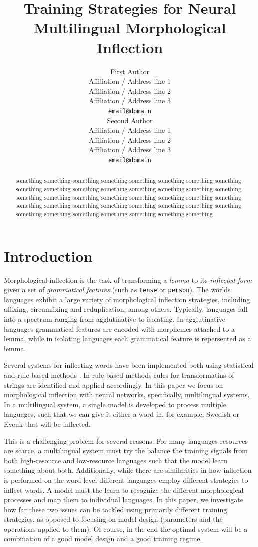 \documentclass[11pt,a4paper]{article}
\title{Training Strategies for Neural Multilingual Morphological Inflection}
\author{First Author \\
  Affiliation / Address line 1 \\
  Affiliation / Address line 2 \\
  Affiliation / Address line 3 \\
  \texttt{email@domain} \\\And
  Second Author \\
  Affiliation / Address line 1 \\
  Affiliation / Address line 2 \\
  Affiliation / Address line 3 \\
  \texttt{email@domain} \\}
\date{}
\newcommand\jp[1]{\textbf{JP: #1}}
\begin{document}
\maketitle
\begin{abstract}
something something something something something something
something something something something something something
something something something something something something
something something something something something something
something something something something something something
something something something something something something
something something something 
\end{abstract}

\section{Introduction}


Morphological inflection is the task of transforming a \emph{lemma} to
its \emph{inflected form} given a set of \emph{grammatical features}
(such as \texttt{tense} or \texttt{person}).  The worlds languages
exhibit a large variety of morphological inflection strategies,
including affixing, circumfixing and reduplication, among
others.
Typically, languages
fall into a spectrum ranging from agglutinative to isolating. In
agglutinative languages grammatical features are encoded with
morphemes attached to a lemma, while in isolating languages each
grammatical feature is repersented as a lemma.

Several systems for inflecting words have been implemented both using
statistical \cite{DBLP:conf/eacl/SmitVGK14, kann2016med} and rule-based
methods \cite{DBLP:phd/basesearch/Hulden09}. In rule-based methods rules for
transformatins of strings are identified and applied accordingly. In
this paper we focus on morphological inflection with neural networks,
specifically, multilingual systems. In a multilingual system, a single
model is developed to process multiple languages, such that we can
give it either a word in, for example, Swedish or Evenk that will be
inflected.

This is a challenging problem for several reasons. For many languages
resources are scarce, a multilingual system must try the balance the
training signals from both high-resource and low-resource languages
such that the model learn something about both. Additionally, while
there are similarities in how inflection is performed on the
word-level different languages employ different strategies to inflect
words. A model must the learn to recognize the different morphological
processes and map them to individual languages.  In this paper, we
investigate how far these two issues can be tackled using primarily
different training strategies, as opposed to focusing on model design
(parameters and the operations applied to them).  Of course, in the
end the optimal system will be a combination of a good model design
and a good training regime. 
\end{document}
